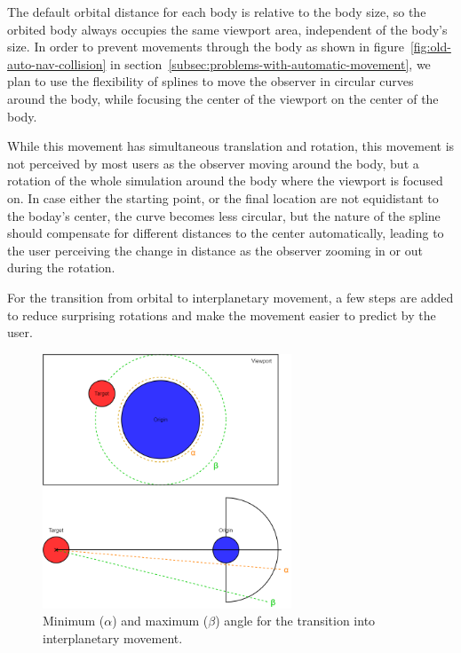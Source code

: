 The default orbital distance for each body is relative to the body size, so the orbited body always occupies the
same viewport area, independent of the body's size.
In order to prevent movements through the body as shown in figure~\ref{fig:old-auto-nav-collision} in
section~\ref{subsec:problems-with-automatic-movement}, we plan to use the flexibility of splines to move the observer
in circular curves around the body, while focusing the center of the viewport on the center of the body.

While this movement has simultaneous translation and rotation, this movement is not perceived by most users as the
observer moving around the body, but a rotation of the whole simulation around the body where the viewport is focused
on.
In case either the starting point, or the final location are not equidistant to the boday's center, the curve becomes
less circular, but the nature of the spline should compensate for different distances to the center automatically,
leading to the user perceiving the change in distance as the observer zooming in or out during the rotation.

For the transition from orbital to interplanetary movement, a few steps are added to reduce surprising rotations and
make the movement easier to predict by the user.

\begin{figure}[h]
    \centering
    \includegraphics[width=0.66\textwidth]{content/4_3_autoNavigation/img/OrbitTransitionAngles}
    \caption{Minimum ($\alpha$) and maximum ($\beta$) angle for the transition into interplanetary movement.}
    \label{fig:orbital-transition-angles}
\end{figure}

